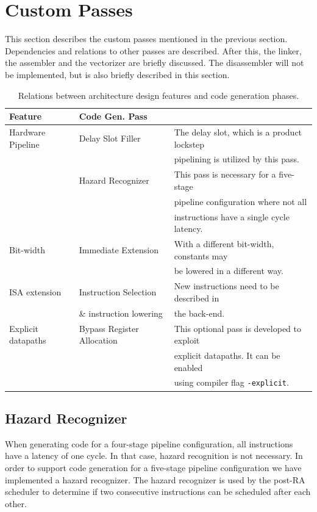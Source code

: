 \section{Custom Passes}
This section describes the custom passes mentioned in the previous section. Dependencies and relations to other passes are described. After this, the linker, the assembler and the vectorizer are briefly discussed. The disassembler will not be implemented, but is also briefly described in this section.

\begin{table}[t!]
\caption{Relations between architecture design features and code generation phases.}
\begin{center}
\begin{tabular}{@{}l l l@{}}
\toprule
\textbf{Feature} & \textbf{Code Gen. Pass} \\ \hline
Hardware Pipeline 	& Delay Slot Filler 		& The delay slot, which is a product lockstep\\
				&					& pipelining is utilized by this pass.\\
			 	& Hazard Recognizer 	& This pass is necessary for a five-stage \\
				&					& pipeline configuration where not all\\
				&					& instructions have a single cycle latency.\\
Bit-width 			& Immediate Extension 	& With a different bit-width, constants may\\
				&				    	& be lowered in a different way. \\
ISA extension		& Instruction Selection 	& New instructions need to be described in\\
				& \& instruction lowering	& the back-end. \\
Explicit datapaths 	& Bypass Register Allocation & This optional pass is developed to exploit\\
				&					& explicit datapaths. It can be enabled\\
				&					& using compiler flag \texttt{-explicit}. \\
\bottomrule
\end{tabular}
\end{center}
\label{table:rel_feature_pass}
\end{table}%

\subsection{Hazard Recognizer}\label{sec:hazard_recogn}
When generating code for a four-stage pipeline configuration, all instructions have a latency of one cycle. In that case, hazard recognition is not necessary.
In order to support code generation for a five-stage pipeline configuration we have implemented a hazard recognizer. The hazard recognizer is used by the post-RA scheduler to determine if two consecutive instructions can be scheduled after each other. 


